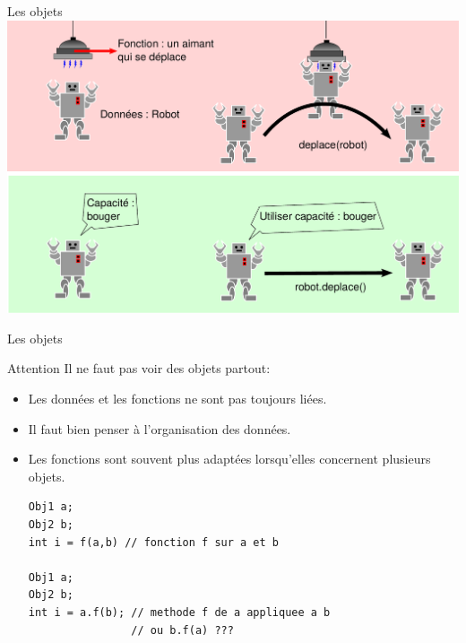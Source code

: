 \begin{frame}{Les objets}
    \centering
    \includegraphics[width=\linewidth]{images/robot.pdf}
\end{frame}

\begin{frame}[fragile]{Les objets}
    \begin{alertblock}{Attention}
        Il ne faut pas voir des objets partout:
        \begin{itemize}
            \item Les données et les fonctions ne sont pas toujours liées.
            \item Il faut bien penser à l'organisation des données.
            \item Les fonctions sont souvent plus adaptées lorsqu'elles concernent plusieurs objets.
            
                \begin{verbatim}
Obj1 a;
Obj2 b;
int i = f(a,b) // fonction f sur a et b

Obj1 a;
Obj2 b;
int i = a.f(b); // methode f de a appliquee a b
                // ou b.f(a) ???
                \end{verbatim}
            
        \end{itemize}
    \end{alertblock}
\end{frame}

